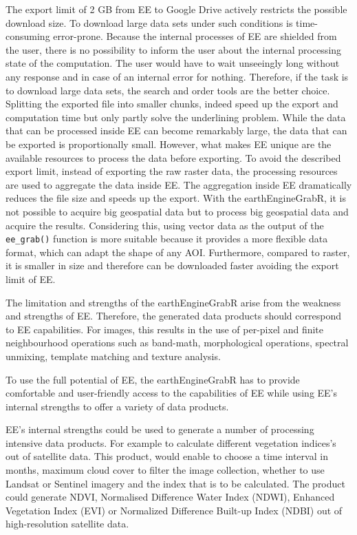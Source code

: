 The export limit of 2 GB from EE to Google Drive actively restricts the possible download size. To download large data sets under such conditions is time-consuming error-prone. Because the internal processes of EE are shielded from the user, there is no possibility to inform the user about the internal processing state of the computation. The user would have to wait unseeingly long without any response and in case of an internal error for nothing.
Therefore, if the task is to download large data sets, the search and order tools are the better choice.
Splitting the exported file into smaller chunks, indeed speed up the export and computation time but only partly solve the underlining problem.
While the data that can be processed inside EE can become remarkably large, the data that can be exported is proportionally small.
However, what makes EE unique are the available resources to process the data before exporting. 
To avoid the described export limit, instead of exporting the raw raster data, the processing resources are used to aggregate the data inside EE.  The aggregation inside EE dramatically reduces the file size and speeds up the export. 
With the earthEngineGrabR, it is not possible to acquire big geospatial data but to process big geospatial data and acquire the results.
Considering this, using vector data as the output of the \texttt{ee\_grab()} function is more suitable because it provides a more flexible data format, which can adapt the shape of any AOI. Furthermore, compared to raster, it is smaller in size and therefore can be downloaded faster avoiding the export limit of EE. 

The limitation and strengths of the earthEngineGrabR arise from the weakness and strengths of EE. Therefore, the generated data products should correspond to EE capabilities. For images, this results in the use of per-pixel and finite neighbourhood operations such as band-math, morphological operations, spectral unmixing, template matching and texture analysis.

To use the full potential of EE, the earthEngineGrabR has to provide comfortable and user-friendly access to the capabilities of EE while using EE's internal strengths to offer a variety of data products.

EE's internal strengths could be used to generate a number of processing intensive data products. For example to calculate different vegetation indices's out of satellite data. This product, would enable to choose a time interval in months, maximum cloud cover to filter the image collection, whether to use Landsat or Sentinel imagery and the index that is to be calculated. The product could generate NDVI, Normalised Difference Water Index (NDWI), Enhanced Vegetation Index (EVI) or Normalized Difference Built-up Index (NDBI) out of high-resolution satellite data.




